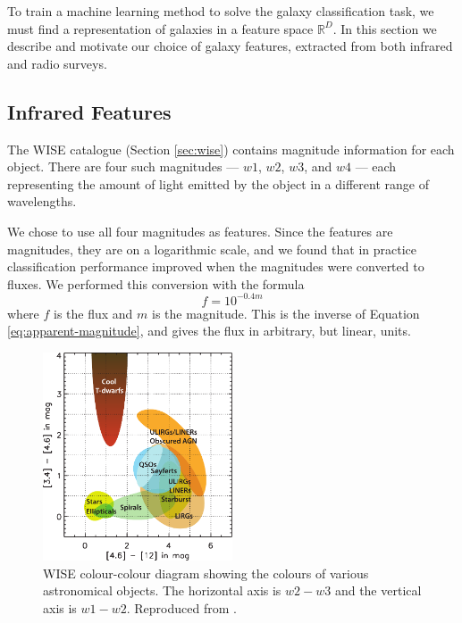   To train a machine learning method to solve the galaxy classification task,
  we must find a representation of galaxies in a feature space $\mathbb{R}^D$.
  In this section we describe and motivate our choice of galaxy features,
  extracted from both infrared and radio surveys.

  \subsection{Infrared Features}
  \label{sec:ir-features}

    The WISE catalogue (Section \ref{sec:wise}) contains magnitude information
    for each object. There are four such magnitudes --- $w1$, $w2$, $w3$, and
    $w4$ --- each representing the amount of light emitted by the object in a
    different range of wavelengths.

    We chose to use all four magnitudes as features. Since the features are
    magnitudes, they are on a logarithmic scale, and we found that in practice
    classification performance improved when the magnitudes were converted to
    fluxes. We performed this conversion with the formula
    \[
      f = 10^{-0.4m}
    \]
    where $f$ is the flux and $m$ is the magnitude. This is the inverse of
    Equation \ref{eq:apparent-magnitude}, and gives the flux in arbitrary, but
    linear, units.

    \begin{figure}[!ht]
      \centering
      \includegraphics[width=0.5\textwidth]{images/wise_colour-colour}
      \caption{WISE colour-colour diagram showing the colours of various
        astronomical objects. The horizontal axis is $w2 - w3$ and the vertical
        axis is $w1 - w2$. Reproduced from \citep{wright10}.}
      \label{fig:wise-colour-colour}
    \end{figure}

